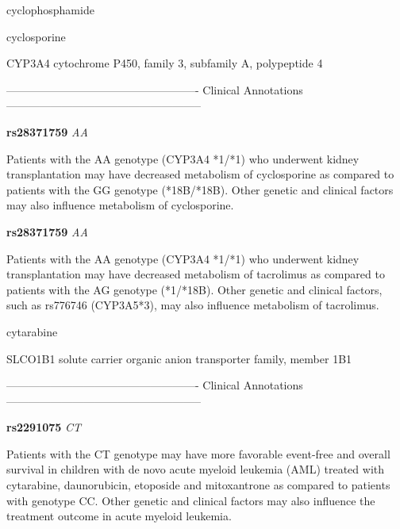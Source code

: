 \documentclass{resume} %
\begin{document}
\begin{rSection}{ cyclophosphamide }
\end{rSection}\begin{rSection}{ cyclosporine }
\item[]

\begin{rSubsection}{ CYP3A4 }{ cytochrome P450, family 3, subfamily A, polypeptide 4 }{}{}
\item[]

\item[] ---------------------------------------------------- Clinical Annotations -----------------------------------------------------\newline
\item \textbf{ rs28371759 } \textit{ AA }
\item[] Patients with the AA genotype (CYP3A4 *1/*1) who underwent kidney transplantation may have decreased metabolism of cyclosporine as compared to patients with the GG genotype (*18B/*18B). Other genetic and clinical factors may also influence metabolism of cyclosporine.\item \textbf{ rs28371759 } \textit{ AA }
\item[] Patients with the AA genotype (CYP3A4 *1/*1) who underwent kidney transplantation may have decreased metabolism of tacrolimus as compared to patients with the AG genotype (*1/*18B). Other genetic and clinical factors, such as rs776746 (CYP3A5*3), may also influence metabolism of tacrolimus.
\end{rSubsection}

\end{rSection}\begin{rSection}{ cytarabine }
\item[]

\begin{rSubsection}{ SLCO1B1 }{ solute carrier organic anion transporter family, member 1B1 }{}{}
\item[]

\item[] ---------------------------------------------------- Clinical Annotations -----------------------------------------------------\newline
\item \textbf{ rs2291075 } \textit{ CT }
\item[] Patients with the CT genotype may have more favorable event-free and overall survival in children with de novo acute myeloid leukemia (AML) treated with cytarabine, daunorubicin, etoposide and mitoxantrone as compared to patients with genotype CC. Other genetic and clinical factors may also influence the treatment outcome in acute myeloid leukemia.
\end{rSubsection}


\end{rSection}
\end{document}
